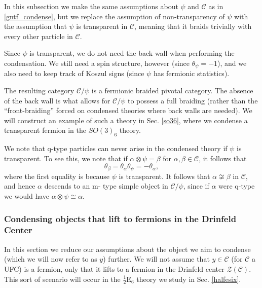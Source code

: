 \documentclass[12pt,a4paper]{article}
\newcommand{\tp}{\otimes}
\newcommand{\mcz}{\mathcal{Z}}
\newcommand{\mcc}{\mathcal{C}}
\newcommand\be            {\begin{equation}}
\newcommand\ee            {\end{equation}}
\newcommand{\ot}{\otimes}
\newcommand{\kw}[1]{{\color{kwcolor}\footnotesize{(KW) #1}}}
\newcommand{\halfesix}{\frac{1}{2}\text{E}_6}
\begin{document}
In this subsection we make the same assumptions about $\psi$ and $\mcc$ as in \ref{gntf_condense}, 
but we replace the assumption of non-transparency of $\psi$ with the 
assumption that $\psi$ is transparent in $\mcc$, meaning that it braids trivially with every other particle in $\mcc$.

Since $\psi$ is transparent, we do not need the back wall when performing the condensation.
We still need a spin structure, however (since $\theta_\psi = -1$), and we also need to keep track of 
Koszul signs (since $\psi$ has fermionic statistics).

The resulting category $\mcc/\psi$ is a fermionic braided pivotal category.
The absence of the back wall is what allows for $\mcc / \psi$ to possess a full braiding (rather than the 
``front-braiding'' forced on condensed theories where back walls are needed). 
We will construct an example of such a theory in Sec. \ref{so36}, where we condense a transparent fermion 
in the $SO(3)_6$ theory.

We note that q-type particles can never arise in the condensed theory if $\psi$ is transparent.
To see this, we note that if $\alpha\ot\psi = \beta$ for $\alpha,\beta\in\mcc$, it follows that 
\be\theta_\beta = \theta_\alpha \theta_\psi = -\theta_\alpha,\ee
where the first equality is because $\psi$ is transparent.
It follows that $\alpha \not\cong \beta$ in $\mcc$, and hence $\alpha$ descends to an m-
type simple object in $\mcc/\psi$, since if $\alpha$ were q-type we would have $\alpha \tp \psi \cong \alpha$.



\subsubsection{Condensing objects that lift to fermions in the Drinfeld Center}
\label{lift_and_condense}

In this section we reduce our assumptions about the object we aim to condense (which we will now refer to as $y$) further. 
We will not assume that $y\in\mcc$ (for $\mcc$ a UFC) is a fermion, only that it lifts to a fermion in the Drinfeld center 
$\mcz(\mcc)$. 
This sort of scenario will occur in the $\halfesix$ theory we study in Sec. \ref{halfesix}.
\end{document}
